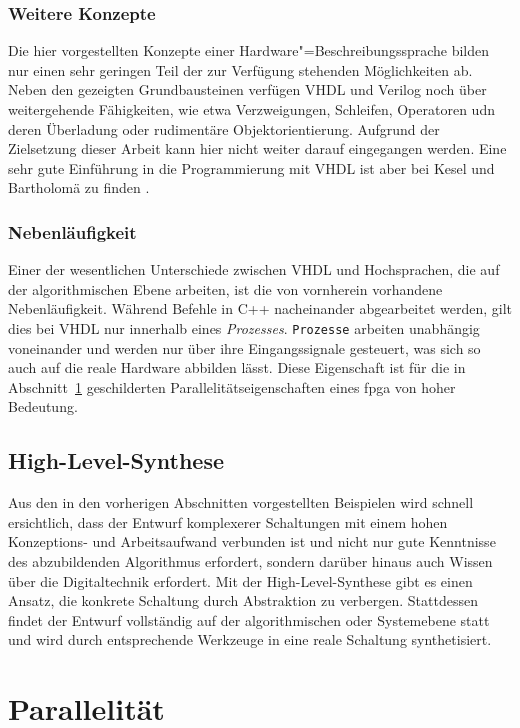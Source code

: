 \subsubsection{Weitere Konzepte}

Die hier vorgestellten Konzepte einer Hardware"=Beschreibungssprache bilden nur
einen sehr geringen Teil der zur Verfügung stehenden Möglichkeiten ab. Neben den
gezeigten Grundbausteinen verfügen VHDL und Verilog noch über weitergehende
Fähigkeiten, wie etwa Verzweigungen, Schleifen, Operatoren udn deren Überladung
oder rudimentäre Objektorientierung. Aufgrund der Zielsetzung dieser Arbeit kann
hier nicht weiter darauf eingegangen werden. Eine sehr gute Einführung in die
Programmierung mit VHDL ist aber bei Kesel und Bartholomä zu finden
\cite[siehe][]{kesel2013}. 

\subsubsection{Nebenläufigkeit}

Einer der wesentlichen Unterschiede zwischen VHDL und Hochsprachen, die auf
der algorithmischen Ebene arbeiten, ist die von vornherein vorhandene
Nebenläufigkeit. Während Befehle in C++ nacheinander abgearbeitet werden, gilt
dies bei VHDL nur innerhalb eines \textit{Prozesses}. \texttt{Prozesse} arbeiten
unabhängig voneinander und werden nur über ihre Eingangssignale gesteuert, was
sich so auch auf die reale Hardware abbilden lässt. Diese Eigenschaft ist für
die in Abschnitt~\ref{fpga:parallelitaet} geschilderten
Parallelitätseigenschaften eines \gls{fpga} von hoher Bedeutung.
\cite[vgl.][25]{kesel2013}

\subsection{High-Level-Synthese}

Aus den in den vorherigen Abschnitten vorgestellten Beispielen wird schnell
ersichtlich, dass der Entwurf komplexerer Schaltungen mit einem hohen
Konzeptions- und Arbeitsaufwand verbunden ist und nicht nur gute Kenntnisse des 
abzubildenden Algorithmus erfordert, sondern darüber hinaus auch Wissen über die
Digitaltechnik erfordert. Mit der High-Level-Synthese gibt es einen Ansatz,
die konkrete Schaltung durch Abstraktion zu verbergen. Stattdessen findet der
Entwurf vollständig auf der algorithmischen oder Systemebene statt und wird
durch entsprechende Werkzeuge in eine reale Schaltung synthetisiert.

\section{Parallelität}\label{fpga:parallelitaet}

